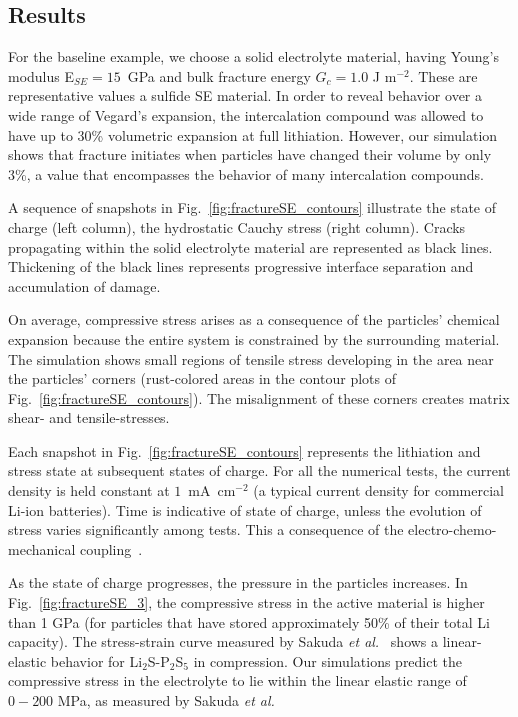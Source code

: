 \documentclass[final,5p,sort&compress]{elsarticle}
\begin{document}
\subsection*{Results}

For the baseline example, we choose a   
solid electrolyte material, having
Young's modulus E$_{SE} = 15$~GPa 
and bulk fracture energy $G_c = 1.0$ J m$^{-2}$.
These are representative values a sulfide SE material.
%
In order to reveal behavior over a wide range of Vegard's expansion, the intercalation compound was allowed to have up to 30\% volumetric expansion at full lithiation.  However, our simulation shows that fracture initiates when particles have changed their volume by only 3\%, a value that encompasses the behavior of many intercalation compounds.

%
A sequence of snapshots in Fig.~\ref{fig:fractureSE_contours} illustrate the state of charge (left column), the hydrostatic Cauchy stress (right column). 
Cracks propagating within the solid electrolyte material are represented as black lines. Thickening of the black lines represents progressive interface separation and accumulation of damage.

On average, compressive stress arises as a consequence of the particles' chemical expansion because the entire system is constrained by the surrounding material.
The simulation shows small regions of tensile stress developing in the area  near the particles' corners (rust-colored areas in the contour plots of Fig.~\ref{fig:fractureSE_contours}). The misalignment of these corners creates matrix shear- and tensile-stresses.  

Each snapshot in Fig.~\ref{fig:fractureSE_contours}  represents the lithiation and stress state at subsequent states of charge.
For all the numerical tests, the current density is held constant at $1$~mA~cm$^{-2}$ (a typical current density for commercial Li-ion batteries).
Time is indicative of state of charge, 
unless the evolution of stress varies significantly among tests. This a consequence of the electro-chemo-mechanical coupling~\cite{Bucci01012017}. 

As the state of charge progresses, the pressure in the particles increases. In Fig.~\ref{fig:fractureSE_3}, the compressive stress in the active material is higher than 1 GPa (for particles that have stored approximately 50\% of their total Li capacity).
The stress-strain curve measured by Sakuda \emph{et al.}~\cite{Sakuda2013youngMod}
shows a linear-elastic behavior  for Li$_2$S-P$_2$S$_5$ in compression. Our simulations predict the compressive stress
in the electrolyte 
to lie within the linear elastic range
of $0 - 200$ MPa, as measured by Sakuda \emph{et al.} 
%
\end{document}

